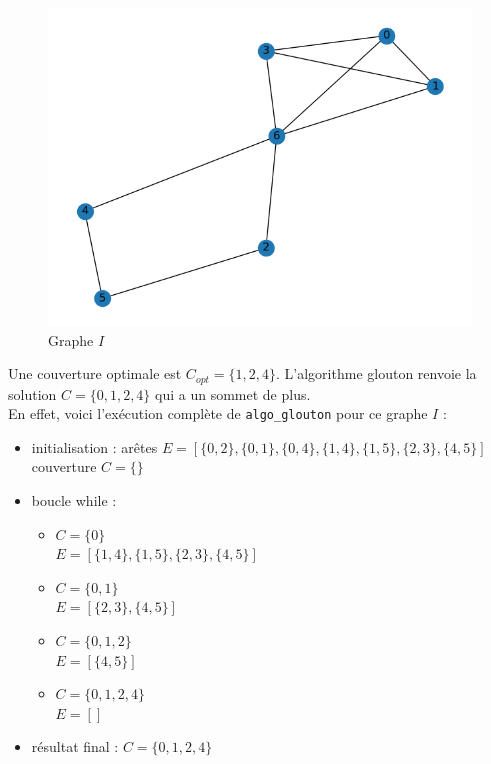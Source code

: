\documentclass[12pt]{article}
\begin{document}
        \begin{figure}[h]
            \caption{Graphe $I$}
            \includegraphics[scale=0.7]{figures/q3-1.png}
            \centering
        \end{figure}

        Une couverture optimale est $C_{opt} = \{1,2,4\}$. L'algorithme glouton renvoie la solution $C = \{0,1,2,4\}$ qui a un sommet de plus. \\
        En effet, voici l'exécution complète de \texttt{algo\_glouton} pour ce graphe $I$ :

        \begin{itemize}
            \item initialisation : arêtes $E = [\{0,2\},\{0,1\},\{0,4\},\{1,4\},\{1,5\},\{2,3\},\{4,5\}]$ \\
            couverture $C = \{\}$
            \item boucle while :
                \begin{itemize}
                    \item $C = \{0\}$ \\
                    $E = [\{1,4\},\{1,5\},\{2,3\},\{4,5\}]$
                    \item $C = \{0,1\}$ \\
                    $E = [\{2,3\},\{4,5\}]$
                    \item $C = \{0,1,2\}$ \\
                    $E = [\{4,5\}]$
                    \item $C = \{0,1,2,4\}$ \\
                    $E = []$
                \end{itemize}
            \item résultat final : $C = \{0,1,2,4\}$
        \end{itemize}
\end{document}
